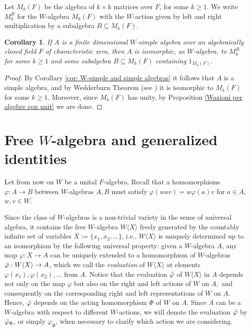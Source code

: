 \documentclass[reqno]{amsart}
\newtheorem{corollary}[theorem]{Corollary}
\theoremstyle{definition}
\numberwithin{equation}{section}
\numberwithin{theorem}{section}
\newcommand{\W}{W\langle X\rangle}
\begin{document}
Let $M_{k}(F)$ be the algebra of $k \times k$ matrices over $F$, for some $k \geq 1.$ We write $M_{k}^B$ for the $W$-algebra $M_k(F)$ with the $W$-action given by left and right multiplication by a subalgebra $B\subseteq M_k(F)$.


\begin{corollary}\label{cor: W-simple algebras}
     If $A$ is a finite dimensional $W$-simple algebra over an algebraically closed field $F$ of characteristic zero, then $A$  is isomorphic, as $W$-algebra, to $M_{k}^B$ for some $k\geq 1$ and some subalgebra $B\subseteq M_k(F)$ containing $1_{M_k(F)}$.
\end{corollary}
\begin{proof}
    By Corollary \ref{cor: W-simple and simple algebras} it follows that $A$ is a simple algebra, and by Wedderburn Theorem (see \cite[Theorem 1.4.4]{Herstein1968}) it is isomorphic to $M_{k}(F)$ for some $k\geq 1$. Moreover, since $M_{k}(F)$ has unity, by Proposition \ref{Wazioni per algebre con unit} we are done.
\end{proof}









\section{Free $W$-algebra and generalized identities}\label{sezione4}




    Let from now on $W$ be a unital $F$-algebra.
    Recall that a homomorphisms $\varphi:A\rightarrow B$ between $W$-algebras $A,B$ must satisfy $\varphi(wav)=w\varphi(a)v$ for $a\in A$, $w,v\in W$. 

    
    Since the class of $W$-algebras is a non-trivial variety in the sense of universal algebra, it contains the free $W$-algebra $\W$ freely generated by the countably infinite set of variables $X:=\{x_1,x_2, \ldots\}$, i.e., $\W$ is uniquely determined up to an isomorphism by the following universal property: given a $W$-algebra $A$, any map $\varphi: X\rightarrow A$ can be uniquely extended to a homomorphism of $W$-algebras $\Bar{\varphi}:\W\rightarrow A$, which we call the \emph{evaluation} of $\W$ at elements $\varphi(x_1),\varphi(x_2),\ldots$ from $A$. Notice that the evaluation $\Bar{\varphi}$ of $\W$ in $A$ depends not only on the map $\varphi$ but also on the right and left actions of $W$ on $A,$ and consequently on the corresponding right and left representations of $W$ on $A.$ Hence, $\Bar{\varphi}$ depends on the acting homomorphism $\Phi$ of $W$ on $A.$ Since $A$ can be a $W$-algebra with respect to different $W$-actions, we will denote the evaluation $\Bar{\varphi}$ by $\Bar{\varphi}_{\Phi}$, or simply $\varphi_{\Phi}$,  when necessary to clarify which action we are considering.
\end{document}
